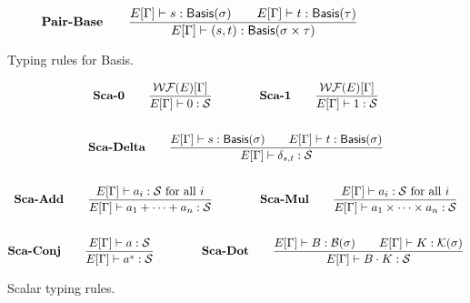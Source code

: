 \documentclass{article}
\begin{document}
\begin{figure}[h]
    \begin{gather*}
        \textbf{Pair-Base} \qquad
        \frac{
            E[\Gamma]\vdash s : \mathsf{Basis}(\sigma) \qquad E[\Gamma]\vdash t : \mathsf{Basis}(\tau)} {E[\Gamma]\vdash (s, t) : \mathsf{Basis}(\sigma \times \tau)} 
        \textbf{}
    \end{gather*}
    \caption{Typing rules for Basis. }
\end{figure}

\begin{figure}[h]
    \begin{gather*}
        \textbf{Sca-0} \qquad
        \frac{\mathcal{WF}(E)[\Gamma]}{E[\Gamma] \vdash 0 : \mathcal{S}}
        \qquad \qquad
        \textbf{Sca-1} \qquad
        \frac{\mathcal{WF}(E)[\Gamma]}{E[\Gamma] \vdash 1 : \mathcal{S}} \\
        \\
        \textbf{Sca-Delta} \qquad
        \frac{ E[\Gamma]\vdash s : \mathsf{Basis}(\sigma) \qquad E[\Gamma]\vdash t : \mathsf{Basis}(\sigma) } {E[\Gamma] \vdash \delta_{s, t} : \mathcal{S}} \\
        \\
        \textbf{Sca-Add} \qquad
        \frac{E[\Gamma]\vdash a_i : \mathcal{S} \text{ for all $i$}}{E[\Gamma]\vdash a_1 + \cdots + a_n : \mathcal{S}}
        \qquad \qquad
        \textbf{Sca-Mul} \qquad
        \frac{E[\Gamma]\vdash a_i : \mathcal{S} \text{ for all $i$}}{E[\Gamma]\vdash a_1 \times \cdots \times a_n : \mathcal{S}} \\
        \\
        \textbf{Sca-Conj} \qquad
        \frac{E[\Gamma] \vdash a : \mathcal{S}}{E[\Gamma] \vdash a^*:\mathcal{S}}
        \qquad \qquad
        \textbf{Sca-Dot} \qquad
        \frac{E[\Gamma]\vdash B : \mathcal{B}(\sigma) \qquad E[\Gamma]\vdash K : \mathcal{K}(\sigma)}{E[\Gamma] \vdash B \cdot K : \mathcal{S}}
    \end{gather*}
    \caption{Scalar typing rules.}
\end{figure}
\end{document}
